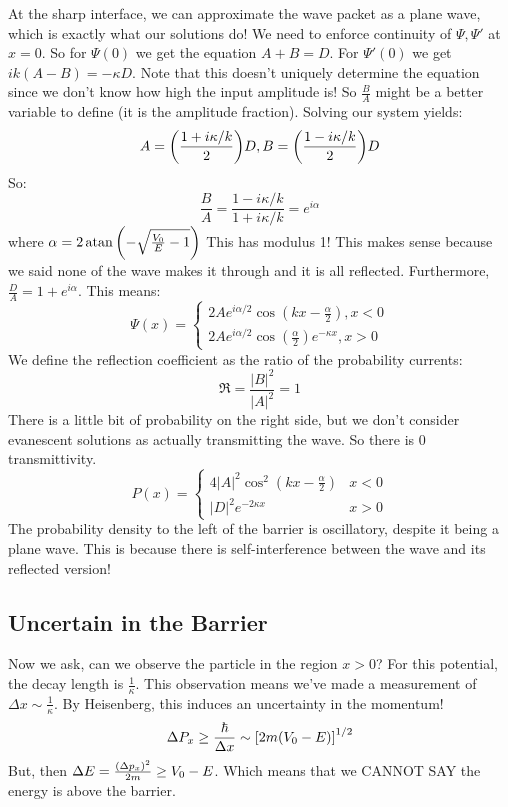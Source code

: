 At the sharp interface, we can approximate the wave packet as a plane wave, which is exactly what our solutions do! We need to enforce
continuity of $\Psi, \Psi'$ at $x = 0$. So for $\Psi(0)$ we get the equation $A + B = D$. For $\Psi'(0)$ we get $ik(A - B) = -\kappa D$.
Note that this doesn't uniquely determine the equation since we don't know how high the input amplitude is! So $\frac{B}{A}$ might be a better
variable to define (it is the amplitude fraction). Solving our system yields:
\[ A = \qty(\frac{1 + i\kappa/k}{2})D, B =  \qty(\frac{1 - i\kappa/k}{2})D \]
So:
\[ \frac{B}{A} = \frac{1 - i\kappa/k}{1 + i\kappa/k} = e^{i \alpha} \]
where $\alpha = 2\atan\qty(- \sqrt{\frac{V_0}{E} - 1})$
This has modulus 1! This makes sense because we said none of the wave makes it through and it is all reflected.
Furthermore, $\frac{D}{A} = 1 + e^{i\alpha}$. This means:
\[ \Psi(x) = \begin{cases}
    2Ae^{i\alpha/2} \cos(kx - \frac{\alpha}{2}), x < 0 \\
    2Ae^{i\alpha/2} \cos(\frac{\alpha}{2})  e^{-\kappa x}, x > 0
\end{cases} \]
We define the reflection coefficient as the ratio of the probability currents:
\[ \mathfrak{R} = \frac{|B|^2}{|A|^2} = 1 \]
There is a little bit of probability on the right side, but we don't consider evanescent solutions as actually transmitting the wave. So there is 0 transmittivity.
\[ P(x) = \begin{cases} 
    4 |A|^2 \cos^2 (kx - \frac{\alpha}{2}) & x<0 \\
    |D|^2 e^{-2\kappa x} & x > 0
\end{cases} \]
The probability density to the left of the barrier is oscillatory, despite it being a plane wave. This is because there is self-interference between the wave and its reflected version!

\subsection{Uncertain in the Barrier}
Now we ask, can we observe the particle in the region $x > 0$? For this potential, the decay length is $\frac{1}{\kappa}$.
This observation means we've made a measurement of $\Delta x \sim \frac{1}{\kappa}$. By Heisenberg, this induces an uncertainty in the momentum!
\[ \Delta P_x \geq \frac{\hbar}{\Delta x} \sim \qty[2m(V_0 - E)]^{1/2} \]
But, then $\Delta E = \frac{\qty(\Delta p_x)^2}{2m} \geq V_0 - E$. Which means that we CANNOT SAY the energy is above the barrier.

